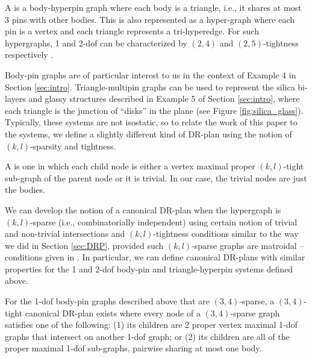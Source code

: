 \begin{definition}
    A  is a body-hyperpin graph where each body
    is a triangle, i.e., it shares at most 3 pins with other bodies. This is also represented as a hyper-graph where each pin is a vertex and each triangle represents a tri-hyperedge. For such hypergraphs, 1 and 2-dof can be characterized by $(2,4)$ and $(2,5)$-tightness respectively \cite{Lee:2007:PGA} \cite{streinu2009sparse}.
\end{definition}

Body-pin graphs are of particular interest to us in the context of Example 4
in Section \ref{sec:intro}. Triangle-multipin graphs can be used to
represent the silica bi-layers and glassy structures described in Example 5
of Section \ref{sec:intro}, where each triangle is the junction of ``disks''
in the plane (see Figure \ref{fig:silica_glass}). Typically, these systems
are not isostatic, so to relate the work of this paper to the systems, we
define a slightly different kind of DR-plan using the notion of
$(k,l)$-sparsity and tightness.

\begin{definition}
    A  is one in which each child node is either a vertex maximal proper $(k,l)$-tight sub-graph of the parent node or it is trivial. In our case, the trivial nodes are just the bodies.
\end{definition}

We can develop the notion of a canonical DR-plan when the hypergraph is
$(k,l)$-sparse (i.e., combinatorially independent) using certain
notion of trivial and non-trivial intersections and
$(k,l)$-tightness conditions similar to the way we did in Section
\ref{sec:DRP}, provided
    such $(k,l)$-sparse graphs are matroidal -- conditions given in \cite{Lee:2007:PGA}.
    In particular, we can define canonical DR-plans with similar properties
    for the 1 and 2-dof body-pin and triangle-hyperpin systems defined
    above.


\begin{observation}
\label{obs:bodypin_drp}
    For the 1-dof body-pin graphs described above that are $(3,4)$-sparse, a $(3,4)$-tight canonical DR-plan exists where every node of a $(3,4)$-sparse graph satisfies one of the following: (1) its children are 2 proper vertex maximal 1-dof graphs that intersect on another 1-dof graph; or (2) its children are all of the proper maximal 1-dof sub-graphs, pairwise sharing at most one body.
\end{observation}

